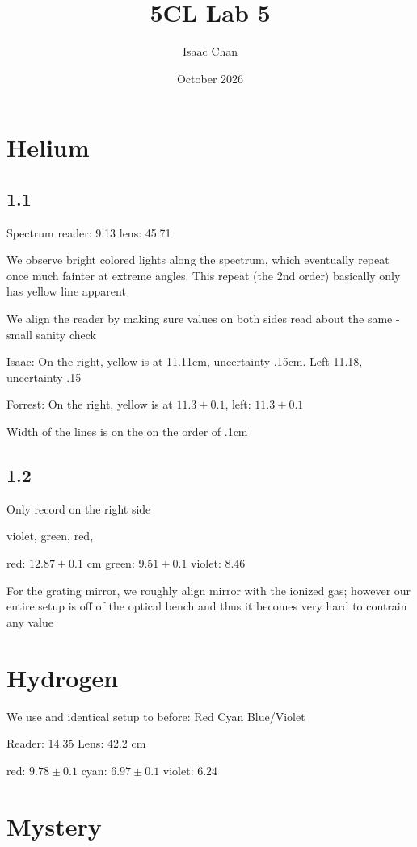 \documentclass{article}
\title{5CL Lab 5}
\author{Isaac Chan}
\date{October 2026}
\begin{document}
\maketitle

\section{Helium}
\subsection{1.1}
Spectrum reader: 9.13
lens: 45.71

We observe bright colored lights along the spectrum, which eventually repeat once much fainter at extreme angles. This repeat (the 2nd order) basically only has yellow line apparent

We align the reader by making sure values on both sides read about the same - small sanity check

Isaac:
On the right, yellow is at 11.11cm, uncertainty .15cm. Left 11.18, uncertainty .15

Forrest:
On the right, yellow is at $11.3\pm0.1$, left: $11.3\pm0.1$

Width of the lines is on the on the order of .1cm

\subsection{1.2}
Only record on the right side

violet, green, red,

red: $12.87 \pm 0.1$ cm
green: $9.51 \pm 0.1$
violet: $8.46 $

For the grating mirror, we roughly align mirror with the ionized gas; however our entire setup is off of the optical bench and thus it becomes very hard to contrain any value

\section{Hydrogen}

We use and identical setup to before:
Red Cyan Blue/Violet

Reader: 14.35
Lens: 42.2 cm

red: $9.78\pm0.1$ 
cyan: $6.97\pm 0.1$
violet: $6.24$

\section{Mystery}
\end{document}
